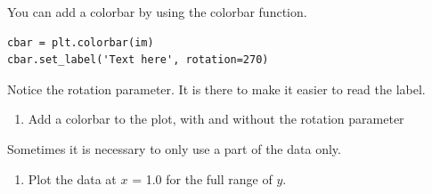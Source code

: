 \documentclass{article}
\begin{document}
You can add a colorbar by using the colorbar function.

\begin{lstlisting}
cbar = plt.colorbar(im)
cbar.set_label('Text here', rotation=270)
\end{lstlisting}

Notice the rotation parameter. It is there to make it easier to read the label.

\begin{enumerate}[resume]

    \item Add a colorbar to the plot, with and without the rotation parameter

\end{enumerate}

Sometimes it is necessary to only use a part of the data only.

\begin{enumerate}[resume]

    \item Plot the data at $x$ = 1.0 for the full range of $y$.

\end{enumerate}


\end{document}
